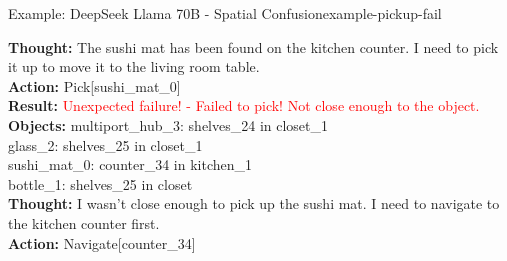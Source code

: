 \begin{Example}{Example: DeepSeek Llama 70B - Spatial Confusion}{example-pickup-fail}

    \textbf{Thought:} The sushi mat has been found on the kitchen counter. I need to pick it up to move it to the living room table. \\
    \textbf{Action:} Pick[sushi\_mat\_0] \\

    \textbf{Result:} \textcolor{red}{Unexpected failure! - Failed to pick! Not close enough to the object.} \\
    \textbf{Objects:} multiport\_hub\_3: shelves\_24 in closet\_1 \\
    glass\_2: shelves\_25 in closet\_1 \\
    sushi\_mat\_0: counter\_34 in kitchen\_1 \\
    bottle\_1: shelves\_25 in closet \\

    \textbf{Thought:} I wasn't close enough to pick up the sushi mat. I need to navigate to the kitchen counter first. \\
    \textbf{Action:} Navigate[counter\_34]

\end{Example}\label{ex:failed_pickup}


